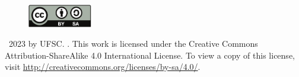 \vfill

\begin{figure}[!h]
	\begin{center}
		\includegraphics[width=0.25\textwidth]{figures/by-sa.pdf}
	\end{center}
\end{figure}

\textcopyright\  2023 by UFSC. \thetitle. This work is licensed under the Creative Commons Attribution-ShareAlike 4.0 International License. To view a copy of this license, visit \href{http://creativecommons.org/licenses/by-sa/4.0/}{http://creativecommons.org/licenses/by-sa/4.0/}.

